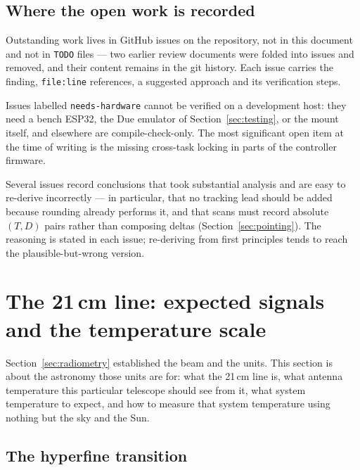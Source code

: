 \documentclass[11pt,a4paper]{article}
\begin{document}
\subsection{Where the open work is recorded}

Outstanding work lives in GitHub issues on the repository, not in this document and not in \texttt{TODO} files --- two earlier review documents were folded into issues and removed, and their content remains in the git history. Each issue carries the finding, \texttt{file:line} references, a suggested approach and its verification steps.

Issues labelled \texttt{needs-hardware} cannot be verified on a development host: they need a bench ESP32, the Due emulator of Section~\ref{sec:testing}, or the mount itself, and elsewhere are compile-check-only. The most significant open item at the time of writing is the missing cross-task locking in parts of the controller firmware.

Several issues record conclusions that took substantial analysis and are easy to re-derive incorrectly --- in particular, that no tracking lead should be added because rounding already performs it, and that scans must record absolute $(T, D)$ pairs rather than composing deltas (Section~\ref{sec:pointing}). The reasoning is stated in each issue; re-deriving from first principles tends to reach the plausible-but-wrong version.

\section{The 21\,cm line: expected signals and the temperature scale}
\label{sec:hiastronomy}

Section~\ref{sec:radiometry} established the beam and the units. This section is about the astronomy those units are for: what the 21\,cm line is, what antenna temperature this particular telescope should see from it, what system temperature to expect, and how to measure that system temperature using nothing but the sky and the Sun.

\subsection{The hyperfine transition}
\end{document}
